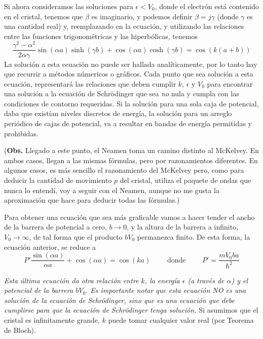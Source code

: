\documentclass[12pt,a4paper]{article}
\begin{document}
Si ahora consideramos las soluciones para $\epsilon <V_{0}$, donde el electrón está contenido en el cristal, tenemos que $\beta$ es imaginario, y podemos definir $\beta=j\gamma$ (donde $\gamma$ es una cantidad real) y, reemplazando en la ecuación, y utilizando las relaciones entre las funciones trigonométricas y las hiperbólicas, tenemos
\[ \frac{\gamma^{2}-\alpha^{2}}{2 \alpha \gamma} \sin(\alpha a) \sinh(\gamma b) + \cos(\alpha a) \cosh(\gamma b) =  \cos(k(a+b)) \]
La solución a esta ecuación no puede ser hallada analíticamente, por lo tanto hay que recurrir a métodos númericos o gráficos. Cada punto que sea solución a esta ecuación, representará las relaciones que deben cumplir $k$, $\epsilon$ y $V_{0}$ para encontrar una solución a la ecuación de Schrödinger que sea \emph{no} nula y cumpla con las condiciones de contorno requeridas. Si la solución para una sola caja de potencial, daba que existían niveles discretos de energía, la solución para un arreglo periódico de cajas de potencial, va a resultar en bandas de energía permitidas y prohibidas.

(\textbf{Obs.} Llegado a este punto, el Neamen toma un camino distinto al McKelvey. En ambos casos, llegan a las mismas fórmulas, pero por razonamientos diferentes. En algunos casos, es más sencillo el razonamiento del McKelvey pero, como para deducir la cantidad de movimiento $p$ del cristal, utiliza el paquete de ondas que nunca lo entendí, voy a seguir con el Neamen, aunque no me gusta la aproximación que hace para deducir todas las fórmulas.)

Para obtener una ecuación que sea más graficable vamos a hacer tender el ancho de la barrera de potencial a cero, $b\rightarrow 0$, y la altura de la barrera a infinito, $V_{0} \rightarrow \infty$, de tal forma que el producto $bV_{0}$ permanezca finito. De esta forma, la ecuación anterior, se reduce a
\[ P' \frac{\sin(\alpha a)}{\alpha a} + \cos (\alpha a) = \cos(ka) \qquad \textrm{ donde } \qquad P'=\frac{mV_{0}ba}{\hbar^{2}} \]

\emph{Esta última ecuación da otra relación entre $k$, la energía $\epsilon$ (a través de $\alpha$) y el potencial de la barrera $bV_{0}$. Es importante notar que esta ecuación NO es una solución de la ecuación de Schrödinger, sino que es una ecuación que debe cumplirse para que la ecuación de Schrödinger tenga solución.} Si asumimos que el cristal es infinitamente grande, $k$ puede tomar cualquier valor real (por Teorema de Bloch).
\end{document}
